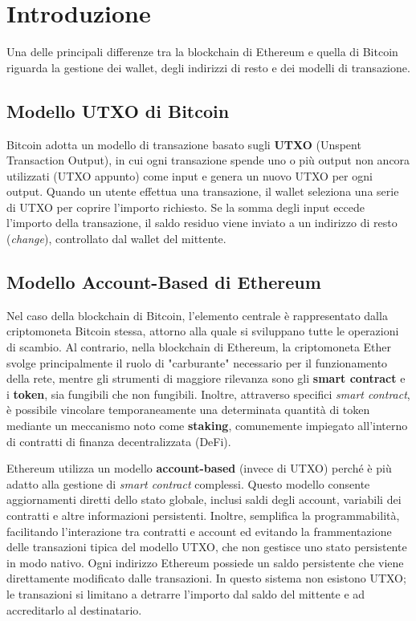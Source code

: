 \chapter{Introduzione}

Una delle principali differenze tra la blockchain di Ethereum e quella di Bitcoin riguarda la gestione dei wallet, degli indirizzi di resto e dei modelli di transazione.

\section{Modello UTXO di Bitcoin}

Bitcoin adotta un modello di transazione basato sugli \textbf{UTXO} (Unspent Transaction Output), in cui ogni transazione spende uno o più output non ancora utilizzati (UTXO appunto) come input e genera un nuovo UTXO per ogni output. Quando un utente effettua una transazione, il wallet seleziona una serie di UTXO per coprire l'importo richiesto. Se la somma degli input eccede l'importo della transazione, il saldo residuo viene inviato a un indirizzo di resto (\textit{change}), controllato dal wallet del mittente\cite{nakamoto2008}.

\section{Modello Account-Based di Ethereum}

Nel caso della blockchain di Bitcoin, l'elemento centrale è rappresentato dalla criptomoneta Bitcoin stessa, attorno alla quale si sviluppano tutte le operazioni di scambio. Al contrario, nella blockchain di Ethereum, la criptomoneta Ether svolge principalmente il ruolo di "carburante" necessario per il funzionamento della rete, mentre gli strumenti di maggiore rilevanza sono gli \textbf{smart contract} e i \textbf{token}, sia fungibili che non fungibili. Inoltre, attraverso specifici \textit{smart contract}, è possibile vincolare temporaneamente una determinata quantità di token mediante un meccanismo noto come \textbf{staking}, comunemente impiegato all'interno di contratti di finanza decentralizzata (DeFi). 

Ethereum utilizza un modello \textbf{account-based} (invece di UTXO) perché è più adatto alla gestione di \textit{smart contract} complessi. Questo modello consente aggiornamenti diretti dello stato globale, inclusi saldi degli account, variabili dei contratti e altre informazioni persistenti. Inoltre, semplifica la programmabilità, facilitando l'interazione tra contratti e account ed evitando la frammentazione delle transazioni tipica del modello UTXO, che non gestisce uno stato persistente in modo nativo. Ogni indirizzo Ethereum possiede un saldo persistente che viene direttamente modificato dalle transazioni. In questo sistema non esistono UTXO; le transazioni si limitano a detrarre l’importo dal saldo del mittente e ad accreditarlo al destinatario\cite{ethereum}.

